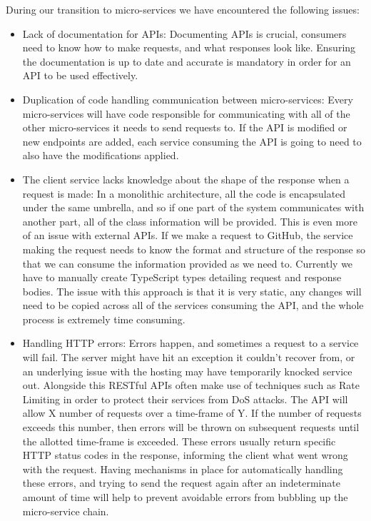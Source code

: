 During our transition to micro-services we have encountered the following issues:
\begin{itemize}
  \item Lack of documentation for APIs: Documenting APIs is crucial, consumers need to know how to make requests, and what responses look like. Ensuring the documentation is up to date and accurate is mandatory in order for an API to be used effectively.
  \item Duplication of code handling communication between micro-services: Every micro-services will have code responsible for communicating with all of the other micro-services it needs to send requests to. If the API is modified or new endpoints are added, each service consuming the API is going to need to also have the modifications applied.
  \item The client service lacks knowledge about the shape of the response when a request is made: In a monolithic architecture, all the code is encapsulated under the same umbrella, and so if one part of the system communicates with another part, all of the class information will be provided. This is even more of an issue with external APIs. If we make a request to GitHub, the service making the request needs to know the format and structure of the response so that we can consume the information provided as we need to. Currently we have to manually create TypeScript types detailing request and response bodies. The issue with this approach is that it is very static, any changes will need to be copied across all of the services consuming the API, and the whole process is extremely time consuming.
  \item Handling HTTP errors: Errors happen, and sometimes a request to a service will fail. The server might have hit an exception it couldn't recover from, or an underlying issue with the hosting may have temporarily knocked service out. Alongside this RESTful APIs often make use of techniques such as Rate Limiting in order to protect their services from DoS attacks. The API will allow X number of requests over a time-frame of Y. If the number of requests exceeds this number, then errors will be thrown on subsequent requests until the allotted time-frame is exceeded. 
  These errors usually return specific HTTP status codes in the response, informing the client what went wrong with the request. Having mechanisms in place for automatically handling these errors, and trying to send the request again after an indeterminate amount of time will help to prevent avoidable errors from bubbling up the micro-service chain.
\end{itemize}

